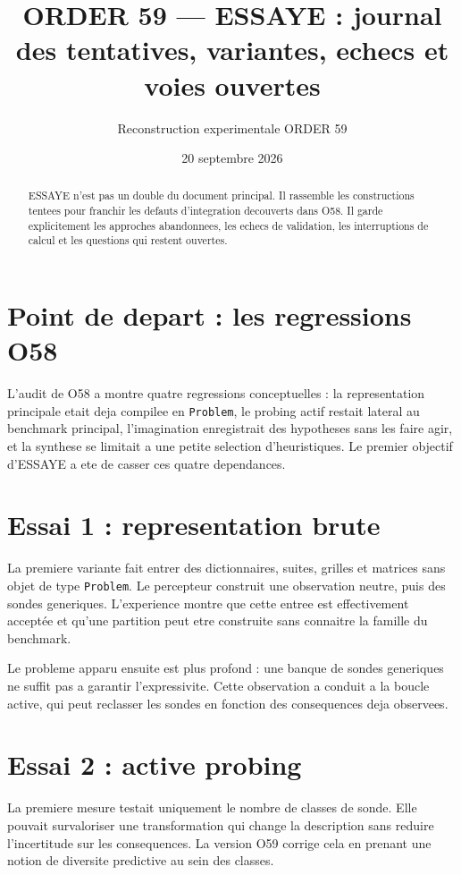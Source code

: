 \documentclass[11pt,a4paper]{article}
\title{ORDER 59 --- ESSAYE : journal des tentatives, variantes, echecs et voies ouvertes}
\author{Reconstruction experimentale ORDER 59}
\date{20 septembre 2026}
\begin{document}
\maketitle
\tableofcontents
\newpage

\begin{abstract}
ESSAYE n'est pas un double du document principal. Il rassemble les constructions tentees pour franchir les defauts d'integration decouverts dans O58. Il garde explicitement les approches abandonnees, les echecs de validation, les interruptions de calcul et les questions qui restent ouvertes.
\end{abstract}

\section{Point de depart : les regressions O58}
L'audit de O58 a montre quatre regressions conceptuelles : la representation principale etait deja compilee en \texttt{Problem}, le probing actif restait lateral au benchmark principal, l'imagination enregistrait des hypotheses sans les faire agir, et la synthese se limitait a une petite selection d'heuristiques. Le premier objectif d'ESSAYE a ete de casser ces quatre dependances.

\section{Essai 1 : representation brute}
La premiere variante fait entrer des dictionnaires, suites, grilles et matrices sans objet de type \texttt{Problem}. Le percepteur construit une observation neutre, puis des sondes generiques. L'experience montre que cette entree est effectivement acceptée et qu'une partition peut etre construite sans connaitre la famille du benchmark.

Le probleme apparu ensuite est plus profond : une banque de sondes generiques ne suffit pas a garantir l'expressivite. Cette observation a conduit a la boucle active, qui peut reclasser les sondes en fonction des consequences deja observees.

\section{Essai 2 : active probing}
La premiere mesure testait uniquement le nombre de classes de sonde. Elle pouvait survaloriser une transformation qui change la description sans reduire l'incertitude sur les consequences. La version O59 corrige cela en prenant une notion de diversite predictive au sein des classes.
\end{document}

